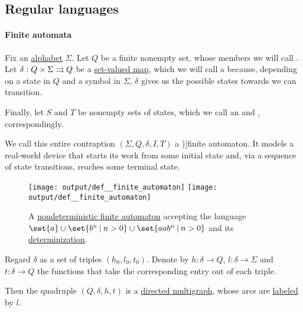 \subsection{Regular languages}\label{subsec:regular_languages}

\paragraph{Finite automata}

\begin{definition}\label{def:finite_automaton}
  Fix an \hyperref[def:formal_language]{alphabet} \( \Sigma \). Let \( Q \) be a finite nonempty set, whose members we will call . Let \( \delta: Q \times \Sigma \rightrightarrows Q \) be a \hyperref[def:set_valued_map]{set-valued map}, which we will call a  because, depending on a state in \( Q \) and a symbol in \( \Sigma \), \( \delta \) gives us the possible states towards we can transition.

  Finally, let \( S \) and \( T \) be nonempty sets of states, which we call an  and , correspondingly.

  We call this entire contraption \( (\Sigma, Q, \delta, I, T) \) a \term[ru=конечный автомат (\cite[159]{Гладкий1973Языки})]{finite automaton}. It models a real-world device that starts its work from some initial state and, via a sequence of state transitions, reaches some terminal state.

  \begin{figure}[!ht]
    \hfill
    \texttt{[image: output/def\_\_finite\_automaton]}
    \hfill
    \texttt{[image: output/def\_\_finite\_automaton]}
    \hfill\hfill
    \caption{A \hyperref[def:finite_automaton/determinism]{nondeterministic finite automaton} accepting the language \( \set{ a } \cup \set{ b^n \given n > 0 } \cup \set{ aa b^n \given n > 0 } \) and its \hyperref[alg:determinization_of_finite_automata]{determinization}.}
    \label{fig:def:finite_automaton}
  \end{figure}

  \begin{thmenum}
    \mimprovised Regard \( \delta \) as a set of triples \( (h_0, l_0, t_0) \). Denote by \( h: \delta \to Q \), \( l: \delta \to \Sigma \) and \( t: \delta \to Q \) the functions that take the corresponding entry out of each triple.

    Then the quadruple \( (Q, \delta, h, t) \) is a \hyperref[def:directed_multigraph]{directed multigraph}, whose arcs are \hyperref[def:labeled_set]{labeled} by \( l \).


\end{thmenum}
\end{definition}
